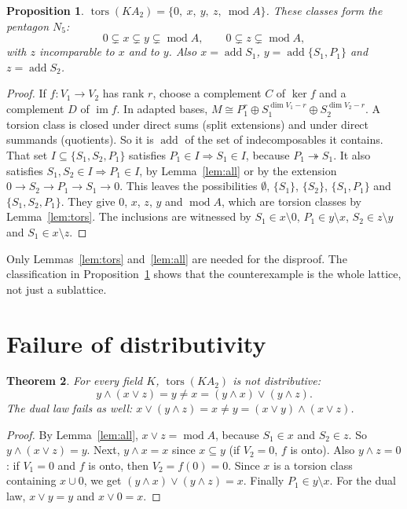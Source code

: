 \documentclass[11pt]{article}
\newtheorem{theorem}{Theorem}
\newtheorem{proposition}[theorem]{Proposition}
\theoremstyle{definition}
\theoremstyle{remark}
\newcommand{\tors}{\operatorname{tors}}
\newcommand{\add}{\operatorname{add}}
\newcommand{\md}{\operatorname{mod}}
\begin{document}
\begin{proposition}\label{prop:N5}
$\tors(KA_2)=\{0,\ x,\ y,\ z,\ \md A\}$. These classes form the pentagon $N_5$:
\[
0\subsetneq x\subsetneq y\subsetneq \md A,\qquad 0\subsetneq z\subsetneq\md A,
\]
with $z$ incomparable to $x$ and to $y$. Also $x=\add S_1$, $y=\add\{S_1,P_1\}$ and
$z=\add S_2$.
\end{proposition}
\begin{proof}
If $f\colon V_1\to V_2$ has rank $r$, choose a complement $C$ of $\ker f$ and a complement $D$
of $\operatorname{im}f$. In adapted bases, $M\cong P_1^r\oplus S_1^{\dim V_1-r}\oplus
S_2^{\dim V_2-r}$. A torsion class is closed under direct sums (split extensions) and under
direct summands (quotients). So it is $\add$ of the set of indecomposables it contains. That set
$I\subseteq\{S_1,S_2,P_1\}$ satisfies $P_1\in I\Rightarrow S_1\in I$, because
$P_1\twoheadrightarrow S_1$. It also satisfies $S_1,S_2\in I\Rightarrow P_1\in I$, by
Lemma~\ref{lem:all} or by the extension $0\to S_2\to P_1\to S_1\to0$. This leaves the
possibilities $\emptyset$, $\{S_1\}$, $\{S_2\}$, $\{S_1,P_1\}$ and $\{S_1,S_2,P_1\}$. They give
$0$, $x$, $z$, $y$ and $\md A$, which are torsion classes by Lemma~\ref{lem:tors}. The
inclusions are witnessed by $S_1\in x\setminus 0$, $P_1\in y\setminus x$,
$S_2\in z\setminus y$ and $S_1\in x\setminus z$.
\end{proof}

Only Lemmas~\ref{lem:tors} and~\ref{lem:all} are needed for the disproof. The classification in
Proposition~\ref{prop:N5} shows that the counterexample is the whole lattice, not just a
sublattice.

\section{Failure of distributivity}

\begin{theorem}\label{thm:main}
For every field $K$, $\tors(KA_2)$ is not distributive:
\[
y\wedge(x\vee z)=y\neq x=(y\wedge x)\vee(y\wedge z).
\]
The dual law fails as well: $x\vee(y\wedge z)=x\neq y=(x\vee y)\wedge(x\vee z)$.
\end{theorem}
\begin{proof}
By Lemma~\ref{lem:all}, $x\vee z=\md A$, because $S_1\in x$ and $S_2\in z$. So
$y\wedge(x\vee z)=y$. Next, $y\wedge x=x$ since $x\subseteq y$ (if $V_2=0$, $f$ is onto). Also
$y\wedge z=0$: if $V_1=0$ and $f$ is onto, then $V_2=f(0)=0$. Since $x$ is a torsion class
containing $x\cup 0$, we get $(y\wedge x)\vee(y\wedge z)=x$. Finally $P_1\in y\setminus x$. For
the dual law, $x\vee y=y$ and $x\vee 0=x$.
\end{proof}
\end{document}
